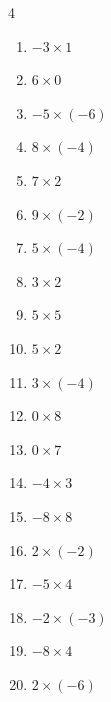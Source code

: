\begin{multicols}{4}
\begin{enumerate}
  \item $-3\times 1$
        \phantom{$=-3$}

  \item $6\times 0$
        \phantom{$=0$}

\columnbreak %

\resetques

  \item $-5\times (-6)$
        \phantom{$=30$}

  \item $8\times (-4)$
        \phantom{$=-32$}

  \item $7\times 2$
        \phantom{$=14$}

  \item $9\times (-2)$
        \phantom{$=-18$}

  \item $5\times (-4)$
        \phantom{$=-20$}

  \item $3\times 2$
        \phantom{$=6$}

  \item $5\times 5$
        \phantom{$=25$}

  \item $5\times 2$
        \phantom{$=10$}

  \item $3\times (-4)$
        \phantom{$=-12$}

  \item $0\times 8$
        \phantom{$=0$}

  \item $0\times 7$
        \phantom{$=0$}

  \item $-4\times 3$
        \phantom{$=-12$}

  \item $-8\times 8$
        \phantom{$=-64$}

  \item $2\times (-2)$
        \phantom{$=-4$}

  \item $-5\times 4$
        \phantom{$=-20$}

  \item $-2\times (-3)$
        \phantom{$=6$}

  \item $-8\times 4$
        \phantom{$=-32$}

  \item $2\times (-6)$
        \phantom{$=-12$}


\end{enumerate}
\end{multicols}
